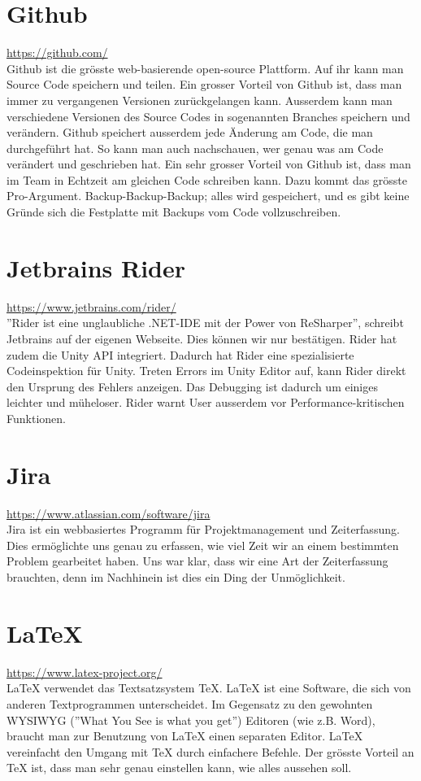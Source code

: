 \section{Github}
\url{https://github.com/}\\
Github ist die grösste web-basierende open-source Plattform. Auf ihr kann man Source Code speichern und teilen. Ein grosser Vorteil von Github ist, dass man immer zu vergangenen Versionen zurückgelangen kann.
Ausserdem kann man verschiedene Versionen des Source Codes in sogenannten Branches speichern und verändern. Github speichert ausserdem jede Änderung am Code, die man durchgeführt hat. So kann man auch nachschauen,
wer genau was am Code verändert und geschrieben hat. Ein sehr grosser Vorteil von Github ist, dass man im Team in Echtzeit am gleichen Code schreiben kann. Dazu kommt das grösste Pro-Argument. Backup-Backup-Backup; 
alles wird gespeichert, und es gibt keine Gründe sich die Festplatte mit Backups vom Code vollzuschreiben.


\section{Jetbrains Rider}
\url{https://www.jetbrains.com/rider/}\\
''Rider ist eine unglaubliche .NET-IDE mit der Power von ReSharper'', schreibt Jetbrains auf der eigenen Webseite. Dies können wir nur bestätigen. Rider hat zudem die Unity API integriert. Dadurch hat Rider eine
spezialisierte Codeinspektion für Unity. Treten Errors im Unity Editor auf, kann Rider direkt den Ursprung des Fehlers anzeigen. Das Debugging ist dadurch um einiges leichter und müheloser. 
Rider warnt User ausserdem vor Performance-kritischen Funktionen. 


\section{Jira}
\url{https://www.atlassian.com/software/jira}\\
Jira ist ein webbasiertes Programm für Projektmanagement und Zeiterfassung. Dies ermöglichte uns genau zu erfassen, wie viel Zeit wir an einem bestimmten Problem gearbeitet haben. Uns war klar, dass wir eine Art 
der Zeiterfassung brauchten, denn im Nachhinein ist dies ein Ding der Unmöglichkeit.

\section{LaTeX}
\url{https://www.latex-project.org/}\\
LaTeX verwendet das Textsatzsystem TeX. LaTeX ist eine Software, die sich von anderen Textprogrammen unterscheidet. Im Gegensatz zu den gewohnten WYSIWYG (''What You See is what you get'') Editoren (wie z.B. Word),
braucht man zur Benutzung von LaTeX einen separaten Editor. LaTeX vereinfacht den Umgang mit TeX durch einfachere Befehle. Der grösste Vorteil an TeX ist, dass man sehr genau einstellen kann, wie alles aussehen soll.


